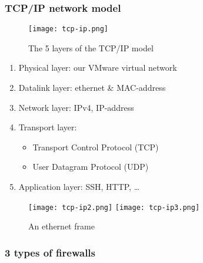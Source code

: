 \documentclass{article}
\begin{document}
\subsubsection{TCP/IP network model}

\begin{figure}[H]
    \centering
    \texttt{[image: tcp-ip.png]}
    \caption{The 5 layers of the TCP/IP model}
\end{figure}

\begin{enumerate}
    \item Physical layer: our VMware virtual network
    \item Datalink layer: ethernet \& MAC-address
    \item Network layer: IPv4, IP-address
    \item Transport layer:
    \begin{itemize}
        \item Transport Control Protocol (TCP)
        \item User Datagram Protocol (UDP)
    \end{itemize}
    \item Application layer: SSH, HTTP, \dots
\end{enumerate}

\begin{figure}[H]
    \centering
    \texttt{[image: tcp-ip2.png]}
    \texttt{[image: tcp-ip3.png]}
    \caption{An ethernet frame}
\end{figure}

\subsubsection{3 types of firewalls}
\end{document}
